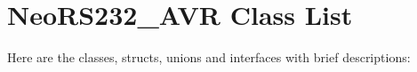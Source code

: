 \section{Neo\-RS232\_\-AVR Class List}
Here are the classes, structs, unions and interfaces with brief descriptions:\begin{CompactList}
\item{}
\item{}
\end{CompactList}
